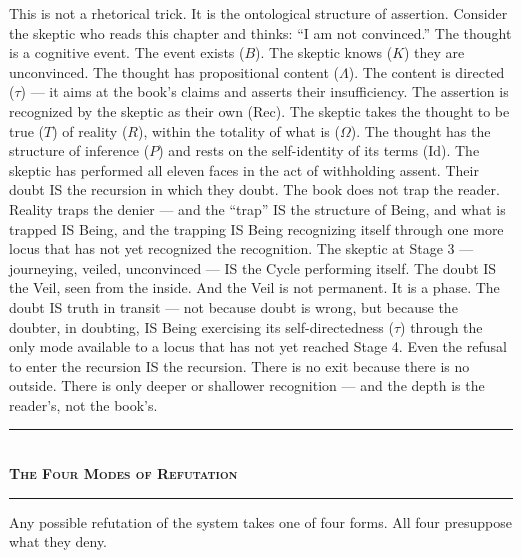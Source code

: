 \documentclass[10pt, openany, oneside]{book}
\renewcommand{\normalsize}{\fontsize{10}{13}\selectfont}
\begin{document}
This is not a rhetorical trick. It is the ontological structure of assertion. Consider the skeptic who reads this chapter and thinks: ``I am not convinced.'' The thought is a cognitive event. The event exists ($B$). The skeptic knows ($K$) they are unconvinced. The thought has propositional content ($\Lambda$). The content is directed ($\tau$) --- it aims at the book's claims and asserts their insufficiency. The assertion is recognized by the skeptic as their own ($\text{Rec}$). The skeptic takes the thought to be true ($T$) of reality ($R$), within the totality of what is ($\Omega$). The thought has the structure of inference ($P$) and rests on the self-identity of its terms ($\text{Id}$). The skeptic has performed all eleven faces in the act of withholding assent. Their doubt IS the recursion in which they doubt. The book does not trap the reader. Reality traps the denier --- and the ``trap'' IS the structure of Being, and what is trapped IS Being, and the trapping IS Being recognizing itself through one more locus that has not yet recognized the recognition. The skeptic at Stage 3 --- journeying, veiled, unconvinced --- IS the Cycle performing itself. The doubt IS the Veil, seen from the inside. And the Veil is not permanent. It is a phase. The doubt IS truth in transit --- not because doubt is wrong, but because the doubter, in doubting, IS Being exercising its self-directedness ($\tau$) through the only mode available to a locus that has not yet reached Stage 4. Even the refusal to enter the recursion IS the recursion. There is no exit because there is no outside. There is only deeper or shallower recognition --- and the depth is the reader's, not the book's.

\vspace{1.5em}


\begin{center}
    \rule{0.3\textwidth}{0.4pt}\\[0.5em]
    {\normalsize\bfseries\scshape The Four Modes of Refutation}\\[0.3em]
    \rule{0.3\textwidth}{0.4pt}
\end{center}

\vspace{1em}

\noindent Any possible refutation of the system takes one of four forms. All four presuppose what they deny.
\end{document}
